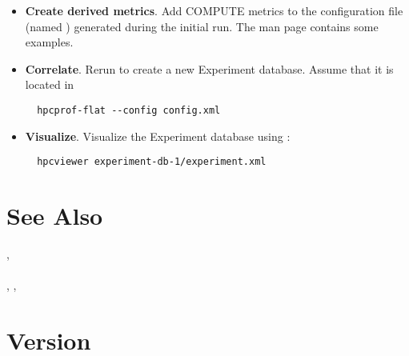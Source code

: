 \documentclass[english]{article}
\begin{document}
\begin{itemize}
\item \textbf{Create derived metrics}.  Add COMPUTE metrics to the  configuration file (named ) generated during the initial run.  The  man page contains some examples. 

\item \textbf{Correlate}. Rerun  to create a new Experiment database.  Assume that it is located in 
\begin{verbatim}
  hpcprof-flat --config config.xml
\end{verbatim}

\item \textbf{Visualize}.
Visualize the Experiment database using :
\begin{verbatim}
  hpcviewer experiment-db-1/experiment.xml
\end{verbatim}

\end{itemize}



\section{See Also}

,  \\
 \\
, ,  \\ %

\section{Version}
\end{document}
